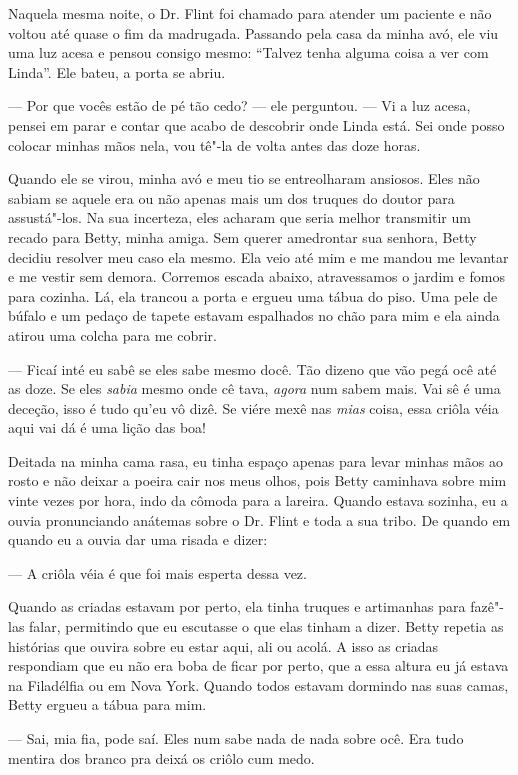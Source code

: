 Naquela mesma noite, o Dr. Flint foi
chamado para atender um paciente e não voltou até quase o fim da
madrugada. Passando pela casa da minha avó, ele viu uma luz acesa e
pensou consigo mesmo: ``Talvez tenha alguma coisa a ver com Linda''. Ele
bateu, a porta se abriu.

--- Por que vocês estão de pé tão cedo? --- ele perguntou. --- Vi a luz
acesa, pensei em parar e contar que acabo de descobrir onde Linda está.
Sei onde posso colocar minhas mãos nela, vou tê"-la de volta antes das
doze horas.

Quando ele se virou, minha avó e meu tio se entreolharam ansiosos. Eles
não sabiam se aquele era ou não apenas mais um dos truques do doutor
para assustá"-los. Na sua incerteza, eles acharam que seria melhor
transmitir um recado para Betty, minha amiga. Sem querer amedrontar sua
senhora, Betty decidiu resolver meu caso ela mesmo. Ela veio até mim e
me mandou me levantar e me vestir sem demora. Corremos escada abaixo,
atravessamos o jardim e fomos para cozinha. Lá, ela trancou a porta e
ergueu uma tábua do piso. Uma pele de búfalo e um pedaço de tapete
estavam espalhados no chão para mim e ela ainda atirou uma colcha para
me cobrir.

--- Ficaí inté eu sabê se eles sabe mesmo docê. Tão dizeno que vão pegá
ocê até as doze. Se eles \emph{sabia} mesmo onde cê tava, \emph{agora}
num sabem mais. Vai sê é uma deceção, isso é tudo qu'eu vô dizê. Se
viére mexê nas \emph{mias} coisa, essa criôla véia aqui vai dá é uma
lição das boa!

Deitada na minha cama rasa, eu tinha espaço apenas para levar minhas
mãos ao rosto e não deixar a poeira cair nos meus olhos, pois Betty
caminhava sobre mim vinte vezes por hora, indo da cômoda para a lareira.
Quando estava sozinha, eu a ouvia pronunciando anátemas sobre o Dr.
Flint e toda a sua tribo. De quando em quando eu a ouvia dar uma risada
e dizer:

--- A criôla véia é que foi mais esperta dessa vez.

Quando as criadas estavam por perto, ela tinha truques e artimanhas para
fazê"-las falar, permitindo que eu escutasse o que elas tinham a dizer.
Betty repetia as histórias que ouvira sobre eu estar aqui, ali ou acolá.
A isso as criadas respondiam que eu não era boba de ficar por perto, que
a essa altura eu já estava na Filadélfia ou em Nova York. Quando todos
estavam dormindo nas suas camas, Betty ergueu a tábua para mim.

--- Sai, mia fia, pode saí. Eles num sabe nada de nada sobre ocê. Era
tudo mentira dos branco pra deixá os criôlo cum medo.

